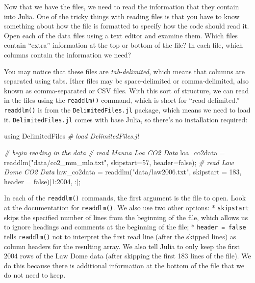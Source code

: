 \documentclass[
  11pt,
]{book}
\newenvironment{Shaded}{\begin{snugshade}}{\end{snugshade}}
\newcommand{\CommentTok}[1]{\textcolor[rgb]{0.37,0.37,0.37}{\textit{#1}}}
\newcommand{\FloatTok}[1]{\textcolor[rgb]{0.06,0.06,0.06}{#1}}
\newcommand{\NormalTok}[1]{#1}
\newcommand{\StringTok}[1]{\textcolor[rgb]{0.5,0.5,0.5}{#1}}
\begin{document}
Now that we have the files, we need to read the information that they contain into Julia. One of the tricky things with reading files is that you have to know something about how the file is formatted to specify how the code should read it. Open each of the data files using a text editor and examine them. Which files contain \enquote{extra} information at the top or bottom of the file? In each file, which columns contain the information we need?

You may notice that these files are \emph{tab-delimited}, which means that columns are separated using tabs. Ither files may be space-delimited or comma-delimited, also known as comma-separated or CSV files. With this sort of structure, we can read in the files using the \texttt{readdlm()} command, which is short for \enquote{read delimited.} \texttt{readdlm()} is from the \texttt{DelimitedFiles.jl} package, which means we need to load it. \texttt{DelimitedFiles.jl} comes with base Julia, so there's no installation required:

\begin{Shaded}
\begin{Highlighting}[]
\NormalTok{using DelimitedFiles }\CommentTok{# load DelimitedFiles.jl}

\CommentTok{# begin reading in the data}
\CommentTok{#  read Mauna Loa CO2 Data}
\NormalTok{loa_co2data = readdlm(}\StringTok{"data/co2_mm_mlo.txt"}\NormalTok{, skipstart=}\FloatTok{57}\NormalTok{, }
\NormalTok{    header=false);}
\CommentTok{# read Law Dome CO2 Data}
\NormalTok{law_co2data = readdlm(}\StringTok{"data/law2006.txt"}\NormalTok{, skipstart = }\FloatTok{183}\NormalTok{, }
\NormalTok{    header = false)[}\FloatTok{1}\NormalTok{:}\FloatTok{2004}\NormalTok{, :]; }
\end{Highlighting}
\end{Shaded}

In each of the \texttt{readdlm()} commands, the first argument is the file to open. Look at \href{https://docs.julialang.org/en/v1/stdlib/DelimitedFiles/\#Delimited-Files}{the documentation for \texttt{readdlm()}}. We also use two other options: * \texttt{skipstart} skips the specified number of lines from the beginning of the file, which allows us to ignore headings and comments at the beginning of the file; * \texttt{header\ =\ false} tells \texttt{readdlm()} not to interpret the first read line (after the skipped lines) as column headers for the resulting array. We also tell Julia to only keep the first 2004 rows of the Law Dome data (after skipping the first 183 lines of the file). We do this because there is additional information at the bottom of the file that we do not need to keep.
\end{document}
